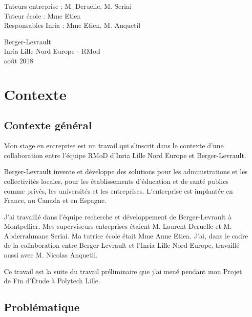 \documentclass[11pt,]{article}
\begin{document}
\begin{titlepage}
\begin{center}
\vfill

\normalsize Tuteurs entreprise : M. Deruelle, M. Seriai \\
Tuteur école : Mme Etien \\
Responsables Inria : Mme Etien, M. Anquetil

\vspace{0.8cm}

\normalsize Berger-Levrault \\ Inria Lille Nord Europe - RMod \\ août 2018

\end{center}
\end{titlepage}

\tableofcontents

\newpage

\hypertarget{contexte}{%
\section{Contexte}\label{contexte}}

\hypertarget{contexte-guxe9nuxe9ral}{%
\subsection{Contexte général}\label{contexte-guxe9nuxe9ral}}

Mon stage en entreprise est un travail qui s'inscrit dans le contexte
d'une collaboration entre l'équipe RMoD d'Inria Lille Nord Europe et
Berger-Levrault.

Berger-Levrault invente et développe des solutions pour les
administrations et les collectivités locales, pour les établissements
d'éducation et de santé publics comme privés, les universités et les
entreprises. L'entreprise est implantée en France, au Canada et en
Espagne.

J'ai travaillé dans l'équipe recherche et développement de
Berger-Levrault à Montpellier. Mes superviseurs entreprises étaient M.
Laurent Deruelle et M. Abderrahmane Seriai. Ma tutrice école était Mme
Anne Etien. J'ai, dans le cadre de la collaboration entre
Berger-Levrault et l'Inria Lille Nord Europe, travaillé aussi avec M.
Nicolas Anquetil.

Ce travail est la suite du travail préliminaire que j'ai mené pendant
mon Projet de Fin d'Étude à Polytech Lille.

\hypertarget{probluxe9matique}{%
\subsection{Problématique}\label{probluxe9matique}}
\end{document}
